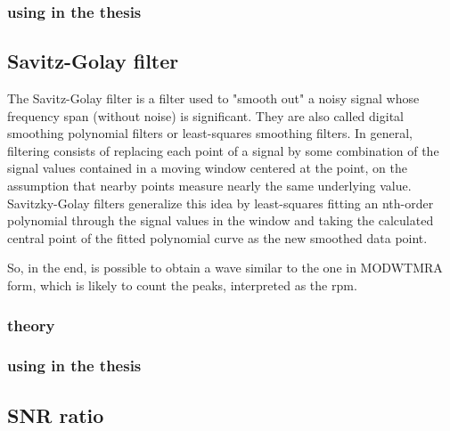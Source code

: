 \subsubsection{using in the thesis}
\subsection{Savitz-Golay filter} \label{sg}


The Savitz-Golay filter is a filter used to "smooth out" a noisy signal whose frequency span (without noise) is significant. 
They are also called digital smoothing polynomial filters or least-squares smoothing filters. 
In general, filtering consists of replacing each point of a signal by some combination of the signal values contained in a moving window centered at the point, on the assumption that nearby points measure nearly the same underlying value. 
Savitzky-Golay filters generalize this idea by least-squares fitting an nth-order polynomial through the signal values in the window and taking the calculated central point of the fitted polynomial curve as the new smoothed data point.

So, in the end, is possible to obtain a wave similar to the one in MODWTMRA form, which is likely to count the peaks, interpreted as the rpm.\\
\subsubsection{theory}
\subsubsection{using in the thesis}

 


\subsection{SNR ratio}

